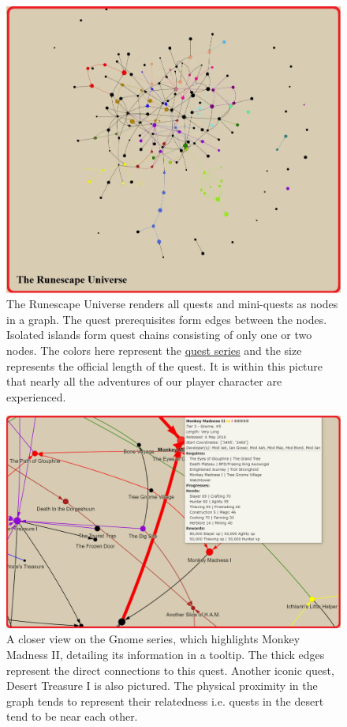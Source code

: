 \begin{figure}
	\centering
	\includegraphics[width=0.8\linewidth]{img/quests/universe.png}
	\caption{
		The Runescape Universe renders all quests and mini-quests as nodes in a graph. The quest prerequisites form edges between the nodes. Isolated islands form quest chains consisting of only one or two nodes. The colors here represent the \href{https://oldschool.runescape.wiki/w/Quests/Series}{quest series} and the size represents the official length of the quest. It is within this picture that nearly all the adventures of our player character are experienced.
	}
	\label{fig:osrs_universe}
\end{figure}




\begin{figure}
	\centering
	\includegraphics[width=0.8\linewidth]{img/quests/zoom.png}
	\caption{
		A closer view on the Gnome series, which highlights Monkey Madness II, detailing its information in a tooltip. The thick edges represent the direct connections to this quest. Another iconic quest, Desert Treasure I is also pictured. The physical proximity in the graph tends to represent their relatedness i.e. quests in the desert tend to be near each other.
	}
	\label{fig:osrs_universe_zoom}
\end{figure}